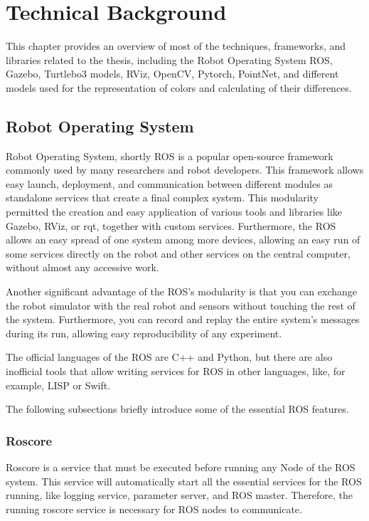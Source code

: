 \chapter{Technical Background}\label{chapter:technicalBackground}

This chapter provides an overview of most of the techniques, frameworks, and libraries related to the thesis, including the Robot Operating System ROS, Gazebo, Turtlebo3 models, RViz, OpenCV, Pytorch, PointNet, and different models used for the representation of colors and calculating of their differences.

\section{Robot Operating System}\label{section:ROS}

Robot Operating System\cite{ros}, shortly ROS is a popular open-source framework commonly used by many researchers and robot developers. This framework allows easy launch, deployment, and communication between different modules as standalone services that create a final complex system. This modularity permitted the creation and easy application of various tools and libraries like Gazebo, RViz, or rqt, together with custom services. Furthermore, the ROS allows an easy spread of one system among more devices, allowing an easy run of some services directly on the robot and other services on the central computer, without almost any accessive work.\par
Another significant advantage of the ROS's modularity is that you can exchange the robot simulator with the real robot and sensors without touching the rest of the system. Furthermore, you can record and replay the entire system's messages during its run, allowing easy reproducibility of any experiment.\par
The official languages of the ROS are C++ and Python, but there are also inofficial tools that allow writing services for ROS in other languages, like, for example, LISP \cite{RosLISP} or Swift\cite{RosSwift}.\par
The following subsections briefly introduce some of the essential ROS features.

\subsection*{Roscore}

Roscore is a service that must be executed before running any Node of the ROS system. This service will automatically start all the essential services for the ROS running, like logging service, parameter server, and ROS master. Therefore, the running roscore service is necessary for ROS nodes to communicate.

